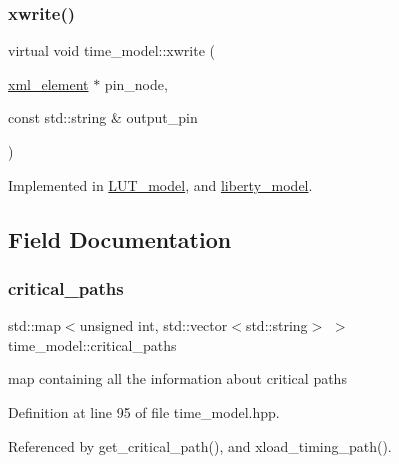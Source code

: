 \subsubsection{\texorpdfstring{xwrite()}{xwrite()}}
{\footnotesize\ttfamily virtual void time\+\_\+model\+::xwrite (\begin{DoxyParamCaption}\item[{\hyperlink{classxml__element}{xml\+\_\+element} $\ast$}]{pin\+\_\+node,  }\item[{const std\+::string \&}]{output\+\_\+pin }\end{DoxyParamCaption})\hspace{0.3cm}{\ttfamily [pure virtual]}}



Implemented in \hyperlink{classLUT__model_a425bc1c19bd99c0b0817051ce78db81f}{L\+U\+T\+\_\+model}, and \hyperlink{classliberty__model_ac02327c2851bea22b94377da3b0b689a}{liberty\+\_\+model}.



\subsection{Field Documentation}
\mbox{\label{classtime__model_afdf3b59507831e6cfe76e88cc3195b0f}} 
\subsubsection{\texorpdfstring{critical\+\_\+paths}{critical\_paths}}
{\footnotesize\ttfamily std\+::map$<$unsigned int, std\+::vector$<$std\+::string$>$ $>$ time\+\_\+model\+::critical\+\_\+paths\hspace{0.3cm}{\ttfamily [protected]}}



map containing all the information about critical paths 



Definition at line 95 of file time\+\_\+model.\+hpp.



Referenced by get\+\_\+critical\+\_\+path(), and xload\+\_\+timing\+\_\+path().

\mbox{\label{classtime__model_a0589dea91b7289451931e24629a4ba66}} 
